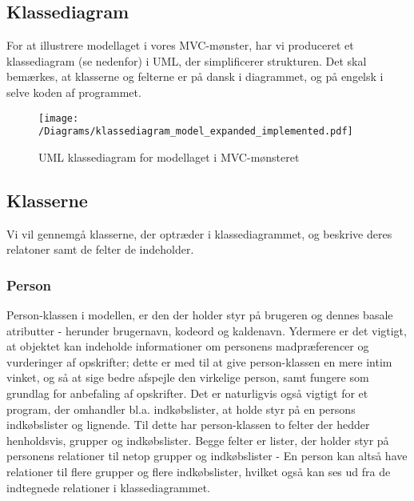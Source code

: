 \subsection{Klassediagram}
For at illustrere modellaget i vores MVC-mønster, har vi produceret et klassediagram (se  nedenfor) i UML, der simplificerer strukturen.
Det skal bemærkes, at klasserne og felterne er på dansk i diagrammet, og på engelsk i selve koden af programmet. 

\begin{figure}[H]
\centering
\texttt{[image: /Diagrams/klassediagram\_model\_expanded\_implemented.pdf]}
\caption{UML klassediagram for modellaget i MVC-mønsteret}\label{diagram:klassediagram}
\end{figure}

\subsection{Klasserne}
Vi vil gennemgå klasserne, der optræder i klassediagrammet, og beskrive deres relatoner samt de felter de indeholder.

\subsubsection{Person}
Person-klassen i modellen, er den der holder styr på brugeren og dennes basale atributter - herunder brugernavn, kodeord og kaldenavn.
Ydermere er det vigtigt, at objektet kan indeholde informationer om personens madpræferencer og vurderinger af opskrifter; dette er med til at give person-klassen en mere intim vinket, og så at sige bedre afspejle den virkelige person, samt fungere som grundlag for anbefaling af opskrifter.
Det er naturligvis også vigtigt for et program, der omhandler bl.a. indkøbslister, at holde styr på en persons indkøbslister og lignende.
Til dette har person-klassen to felter der hedder henholdsvis, grupper og indkøbslister.
Begge felter er lister, der holder styr på personens relationer til netop grupper og indkøbslister - En person kan altså have relationer til flere grupper og flere indkøbslister, hvilket også kan ses ud fra de indtegnede relationer i klassediagrammet.


